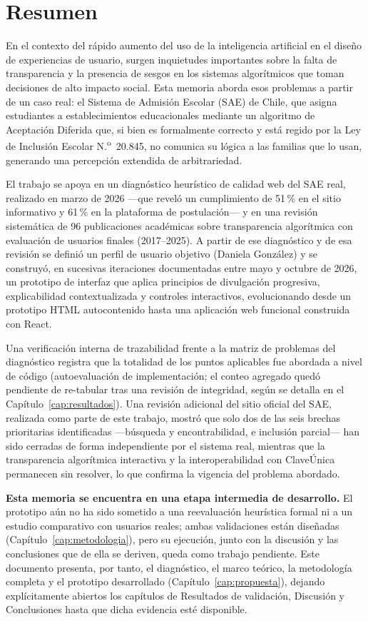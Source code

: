 \chapter*{Resumen}

En el contexto del rápido aumento del uso de la inteligencia artificial en el diseño de experiencias de usuario, surgen inquietudes importantes sobre la falta de transparencia y la presencia de sesgos en los sistemas algorítmicos que toman decisiones de alto impacto social. Esta memoria aborda esos problemas a partir de un caso real: el Sistema de Admisión Escolar (SAE) de Chile, que asigna estudiantes a establecimientos educacionales mediante un algoritmo de Aceptación Diferida que, si bien es formalmente correcto y está regido por la Ley de Inclusión Escolar N.\textsuperscript{o}~20.845, no comunica su lógica a las familias que lo usan, generando una percepción extendida de arbitrariedad.

El trabajo se apoya en un diagnóstico heurístico de calidad web del SAE real, realizado en marzo de 2026 ---que reveló un cumplimiento de 51\,\% en el sitio informativo y 61\,\% en la plataforma de postulación--- y en una revisión sistemática de 96 publicaciones académicas sobre transparencia algorítmica con evaluación de usuarios finales (2017--2025). A partir de ese diagnóstico y de esa revisión se definió un perfil de usuario objetivo (Daniela González) y se construyó, en sucesivas iteraciones documentadas entre mayo y octubre de 2026, un prototipo de interfaz que aplica principios de divulgación progresiva, explicabilidad contextualizada y controles interactivos, evolucionando desde un prototipo HTML autocontenido hasta una aplicación web funcional construida con React.

Una verificación interna de trazabilidad frente a la matriz de problemas del diagnóstico registra que la totalidad de los puntos aplicables fue abordada a nivel de código (autoevaluación de implementación; el conteo agregado quedó pendiente de re-tabular tras una revisión de integridad, según se detalla en el Capítulo~\ref{cap:resultados}). Una revisión adicional del sitio oficial del SAE, realizada como parte de este trabajo, mostró que solo dos de las seis brechas prioritarias identificadas —búsqueda y encontrabilidad, e inclusión parcial— han sido cerradas de forma independiente por el sistema real, mientras que la transparencia algorítmica interactiva y la interoperabilidad con ClaveÚnica permanecen sin resolver, lo que confirma la vigencia del problema abordado.

\textbf{Esta memoria se encuentra en una etapa intermedia de desarrollo.} El prototipo aún no ha sido sometido a una reevaluación heurística formal ni a un estudio comparativo con usuarios reales; ambas validaciones están diseñadas (Capítulo~\ref{cap:metodologia}), pero su ejecución, junto con la discusión y las conclusiones que de ella se deriven, queda como trabajo pendiente. Este documento presenta, por tanto, el diagnóstico, el marco teórico, la metodología completa y el prototipo desarrollado (Capítulo~\ref{cap:propuesta}), dejando explícitamente abiertos los capítulos de Resultados de validación, Discusión y Conclusiones hasta que dicha evidencia esté disponible.
